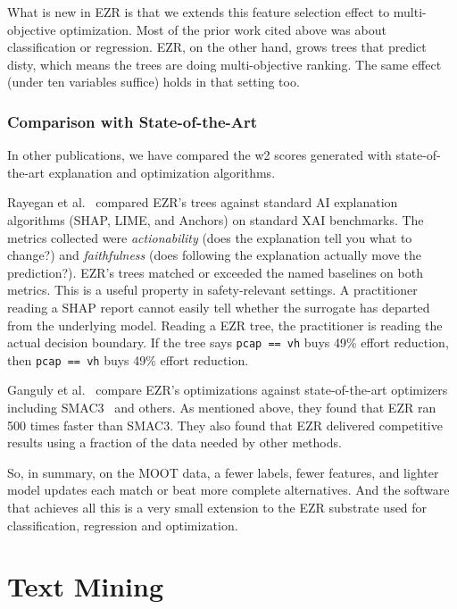 \documentclass[AMA,STIX2COL]{WileyNJDv5}
\newcommand{\IT}{{\sffamily EZR}}
\begin{document}
{What is new in \IT{} is that we extends this feature selection effect
to
multi-objective optimization. Most of the prior work cited above
was about classification or regression. \IT{}, on the other hand, grows trees that
predict \textsf{disty}, which means the trees are doing
multi-objective ranking. The same effect (under ten variables
suffice) holds in that setting too.

\subsubsection{Comparison with State-of-the-Art}\label{sota}

In other publications, we have compared the \textsf{w2} scores generated
 with state-of-the-art explanation and optimization algorithms.


Rayegan et al.~\cite{Amiraliminimaldata} compared \IT{}'s trees against
standard AI explanation algorithms
(SHAP, LIME, and Anchors) on standard XAI benchmarks. The metrics collected
were {\em actionability} (does the explanation tell you what to
change?) and {\em faithfulness} (does following the explanation
actually move the prediction?). \IT{}'s trees matched or
exceeded the named baselines on both metrics.
This is a useful property in safety-relevant settings. A
practitioner reading a SHAP report cannot easily tell whether
the surrogate has departed from the underlying model. Reading a
\IT{} tree, the practitioner is reading the actual decision
boundary. If the tree says \texttt{pcap == vh} buys 49\% effort
reduction, then \texttt{pcap == vh} buys 49\% effort reduction.

Ganguly et al.~\cite{ganguly2026lowgodatalightse}    compare \IT{}'s
optimizations against state-of-the-art optimizers including SMAC3~\cite{hutter2011sequential}
and others.
As mentioned above, they found that  EZR ran 500 times faster than SMAC3. 
They also found that EZR delivered competitive results using a fraction
of the data needed by other methods.

So, in summary,
on the MOOT data, a  fewer labels,
fewer features, and lighter model updates each match or beat
more complete alternatives. And the software that achieves all
this is a very small extension to the EZR substrate used
for classification, regression and optimization.


\section{Text Mining}\label{sec:textmine}

}
\end{document}

